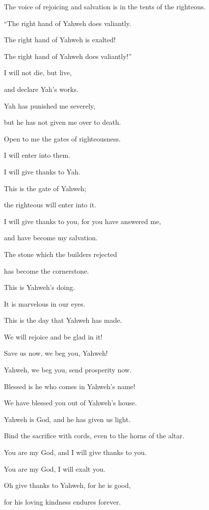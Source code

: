 {\par }{\Q {}The voice of rejoicing and salvation is in the tents of the righteous.
\par }{\QB “The right hand of Yahweh does valiantly.
\par }{\Q {}The right hand of Yahweh is exalted!
\par }{\QB The right hand of Yahweh does valiantly!”
\par }{\Q {}I will not die, but live,
\par }{\QB and declare Yah’s works.
\par }{\Q {}Yah has punished me severely,
\par }{\QB but he has not given me over to death.
\par }{\Q {}Open to me the gates of righteousness.
\par }{\QB I will enter into them.
\par }{\QB I will give thanks to Yah.
\par }{\Q {}This is the gate of Yahweh;
\par }{\QB the righteous will enter into it.
\par }{\Q {}I will give thanks to you, for you have answered me,
\par }{\QB and have become my salvation.
\par }{\Q {}The stone which the builders rejected
\par }{\QB has become the cornerstone.
\par }{\Q {}This is Yahweh’s doing.
\par }{\QB It is marvelous in our eyes.
\par }{\Q {}This is the day that Yahweh has made.
\par }{\QB We will rejoice and be glad in it!
\par }{\Q {}Save us now, we beg you, Yahweh!
\par }{\QB Yahweh, we beg you, send prosperity now.
\par }{\Q {}Blessed is he who comes in Yahweh’s name!
\par }{\QB We have blessed you out of Yahweh’s house.
\par }{\Q {}Yahweh is God, and he has given us light.
\par }{\QB Bind the sacrifice with cords, even to the horns of the altar.
\par }{\Q {}You are my God, and I will give thanks to you.
\par }{\QB You are my God, I will exalt you.
\par }{\Q {}Oh give thanks to Yahweh, for he is good,
\par }{\QB for his loving kindness endures forever.

}
